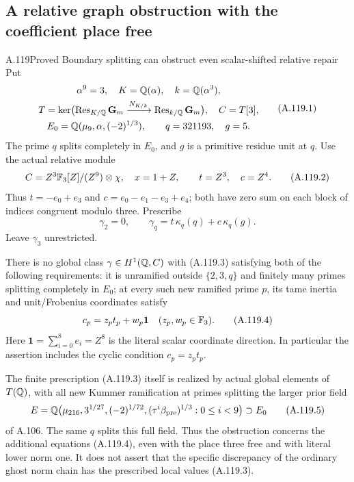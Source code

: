 \subsection{A relative graph obstruction with the coefficient place free}

\begin{statement}{A.119}{Proved}
{Boundary splitting can obstruct even scalar-shifted relative repair}
Put
\[
 \begin{gathered}
 \alpha^9=3,\quad K=\mathbb Q(\alpha),\quad k=\mathbb Q(\alpha^3),\\
 T=\ker\bigl(\operatorname{Res}_{K/\mathbb Q}\mathbf G_m
            \xrightarrow{N_{K/k}}
                         \operatorname{Res}_{k/\mathbb Q}\mathbf G_m\bigr),
 \quad C=T[3],\\
 E_0=\mathbb Q(\mu_9,\alpha,(-2)^{1/3}),\qquad
                  q=321193,\quad g=5.
 \end{gathered}
 \tag{A.119.1}
\]
The prime \(q\) splits completely in \(E_0\), and \(g\)
is a primitive residue unit at \(q\).
Use the actual relative module
\[
 C=Z^3\mathbb F_3[Z]/(Z^9)\otimes\chi,\quad x=1+Z,\qquad
                         t=Z^3,\quad c=Z^4.
 \tag{A.119.2}
\]
Thus \(t=-e_0+e_3\) and
\(c=e_0-e_1-e_3+e_4\); both have zero sum on each
block of indices congruent modulo three.
Prescribe
\[
             \gamma_2=0,\qquad
       \gamma_q=t\,\kappa_q(q)+c\,\kappa_q(g).
 \tag{A.119.3}
\]
Leave \(\gamma_3\) unrestricted.

There is no global class \(\gamma\in H^1(\mathbb Q,C)\)
with (A.119.3) satisfying both of the following
requirements:
it is unramified outside \(\{2,3,q\}\) and finitely
many primes splitting completely in \(E_0\);
at every such new ramified prime \(p\), its tame
inertia and unit/Frobenius coordinates satisfy
\[
                  c_p=z_pt_p+w_p\mathbf1
                         \quad(z_p,w_p\in\mathbb F_3).
 \tag{A.119.4}
\]
Here \(\mathbf1=\sum_{i=0}^8e_i=Z^8\) is the
literal scalar coordinate direction.
In particular the assertion includes the cyclic
condition \(c_p=z_pt_p\).

The finite prescription (A.119.3) itself is realized
by actual global elements of \(T(\mathbb Q)\), with all
new Kummer ramification at primes splitting the
larger prior field
\[
 E=\mathbb Q\bigl(\mu_{216},3^{1/27},(-2)^{1/72},
       (\tau^i\beta_{\rm pre})^{1/3}:0\le i<9\bigr)
                       \supset E_0
 \tag{A.119.5}
\]
of A.106.  The same \(q\) splits this full field.
Thus the obstruction concerns the additional
equations (A.119.4), even with the place three
free and with literal lower norm one.
It does not assert that the specific discrepancy
of the ordinary ghost norm chain has the prescribed
local values (A.119.3).
\end{statement}

